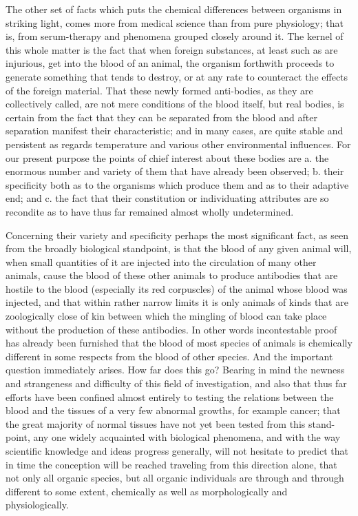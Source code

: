 \documentclass[a4paper, 11pt, oneside, polutonikogreek, english]{article}
\begin{document}
The other set of facts which puts the chemical differences between organisms in striking light, comes more from medical science than from pure physiology; that is, from serum-therapy and phenomena grouped closely around it. The kernel of this whole matter is the fact that when foreign substances, at least such as are injurious, get into the blood of an animal, the organism forthwith proceeds to generate something that tends to destroy, or at any rate to counteract the effects of the foreign material. That these newly formed anti-bodies, as they are collectively called, are not mere conditions of the blood itself, but real bodies, is certain from the fact that they can be separated from the blood and after separation manifest their characteristic; and in many cases, are quite stable and persistent as regards temperature and various other environmental influences. For our present purpose the points of chief interest about these bodies are a. the enormous number and variety of them that have already been observed; b. their specificity both as to the organisms which produce them and as to their adaptive end; and c. the fact that their constitution or individuating attributes are so recondite as to have thus far remained almost wholly undetermined.

Concerning their variety and specificity perhaps the most significant fact, as seen from the broadly biological standpoint, is that the blood of any given animal will, when small quantities of it are injected into the circulation of many other animals, cause the blood of these other animals to produce antibodies that are hostile to the blood (especially its red corpuscles) of the animal whose blood was injected, and that within rather narrow limits it is only animals of kinds that are zoologically close of kin between which the mingling of blood can take place without the production of these antibodies. In other words incontestable proof has already been furnished that the blood of most species of animals is chemically different in some respects from the blood of other species. And the important question immediately arises. How far does this go? Bearing in mind the newness and strangeness and difficulty of this field of investigation, and also that thus far efforts have been confined almost entirely to testing the relations between the blood and the tissues of a very few abnormal growths, for example cancer; that the great majority of normal tissues have not yet been tested from this stand-point, any one widely acquainted with biological phenomena, and with the way scientific knowledge and ideas progress generally, will not hesitate to predict that in time the conception will be reached traveling from this direction alone, that not only all organic species, but all organic individuals are through and through different to some extent, chemically as well as morphologically and physiologically.
\end{document}
